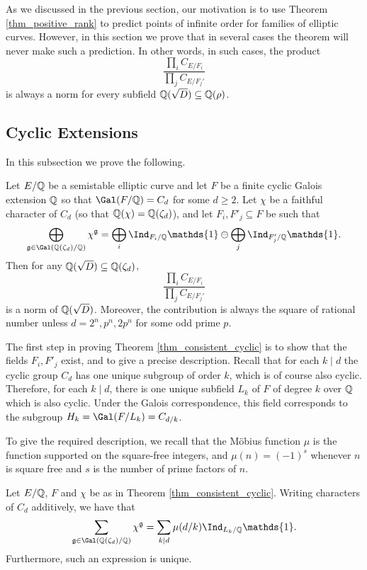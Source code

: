 As we discussed in the previous section, our motivation is to use Theorem \ref*{thm_positive_rank} to predict points of infinite order for families of elliptic curves. However, in this section we prove that in several cases the theorem will never make such a prediction. In other words, in such cases, the product 
$$\frac{\prod_i C_{E/F_i}}{\prod_j C_{E/F_j'}}$$ 
is always a norm for every subfield $\mathbb{Q}(\sqrt{D})\subseteq\mathbb{Q}(\rho)$.

\subsection{Cyclic Extensions}
In this subsection we prove the following. 
\begin{thm}\label{thm_consistent_cyclic}
    Let $E/\mathbb{Q}$ be a semistable elliptic curve and let $F$ be a finite cyclic Galois extension $\mathbb{Q}$ so that $\Gal(F/\QQ)=C_d$ for some $d\geq 2$. Let $\chi$ be a faithful character of $C_d$ (so that $\mathbb{Q}(\chi)=\mathbb{Q}(\zeta_d)$), and let $F_i,F'_j\subseteq F$ be such that
    $$\bigoplus_{\mathfrak{g}\in\Gal(\QQ(\zeta_d)/\QQ)}\chi^{\mathfrak{g}}=\bigoplus_i\Ind_{F_i/\QQ}\mathds{1}\ominus\bigoplus_j\Ind_{F'_j/\QQ}\mathds{1}.$$
    Then for any $\mathbb{Q}(\sqrt{D})\subseteq\mathbb{Q}(\zeta_d)$,
    $$\frac{\prod_i C_{E/F_i}}{\prod_j C_{E/F_j'}}$$
    is a norm of $\mathbb{Q}(\sqrt{D})$. Moreover, the contribution is always the square of rational number unless $d=2^n, p^n,2p^n$ for some odd prime $p$.
\end{thm}

The first step in proving Theorem \ref{thm_consistent_cyclic} is to show that the fields $F_i, F'_j$ exist, and to give a precise description. Recall that for each $k\mid d$ the cyclic group $C_d$ has one unique subgroup of order $k$, which is of course also cyclic. Therefore, for each $k\mid d$, there is one unique subfield $L_k$ of $F$ of degree $k$ over $\mathbb{Q}$ which is also cyclic. Under the Galois correspondence, this field corresponds to the subgroup $H_k=\Gal(F/L_k)=C_{d/k}$.

To give the required description, we recall that the Möbius function $\mu$ is the function supported on the square-free integers, and $\mu(n)=(-1)^s$ whenever $n$ is square free and $s$ is the number of prime factors of $n$.

\begin{lemma}\label{lem_cyclic_decomp}
    Let $E/\mathbb{Q}$, $F$ and $\chi$ be as in Theorem \ref*{thm_consistent_cyclic}. Writing characters of $C_d$ additively, we have that
    \begin{equation}\label{eqn_cyclic_relation}
        \sum_{\mathfrak{g}\in\Gal(\QQ(\zeta_d)/\QQ)}\chi^{\mathfrak{g}}=\sum_{k\mid d}\mu(d/k)\Ind_{L_k/\QQ}\mathds{1}.
    \end{equation}
    Furthermore, such an expression is unique.
\end{lemma}

